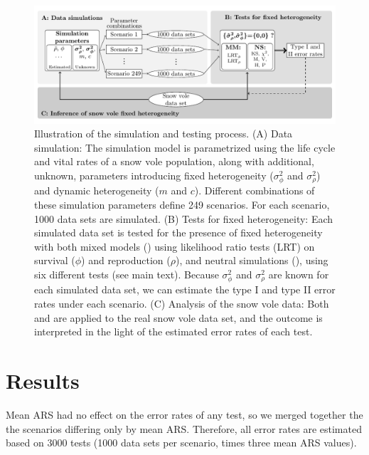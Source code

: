 \begin{figure}[ht]
	\includegraphics[width= \textwidth]{FiguresDynHet/Figure1}
		\caption{\footnotesize Illustration of the simulation and testing process. (A) Data simulation: The simulation model is parametrized using the life cycle and vital rates of a snow vole population, along with additional, unknown, parameters introducing fixed heterogeneity ($\sigma_{\phi}^2$ and $\sigma_{\rho}^2$) and dynamic heterogeneity ($m$ and $c$). Different combinations of these simulation parameters define 249 scenarios. For each scenario, 1000 data sets are simulated. (B) Tests for fixed heterogeneity: Each simulated data set is tested for the presence of fixed heterogeneity with both mixed models (\MM) using likelihood ratio tests (LRT) on survival ($\phi$) and reproduction ($\rho$), and neutral simulations (\NSM), using six different tests (see main text). Because $\sigma_{\phi}^2$ and $\sigma_{\rho}^2$ are known for each simulated data set, we can estimate the type I and type II error rates under each scenario. (C) Analysis of the snow vole data: Both \MM and \NSM are applied to the real snow vole data set, and the outcome is interpreted in the light of the estimated error rates of each test.}
	\label{figure:flow}
\end{figure}
\section{Results}
Mean ARS had no effect on the error rates of any test, so we merged together the the scenarios differing only by mean ARS. Therefore, all error rates are estimated based on 3000 tests (1000 data sets per scenario, times three mean ARS values).

